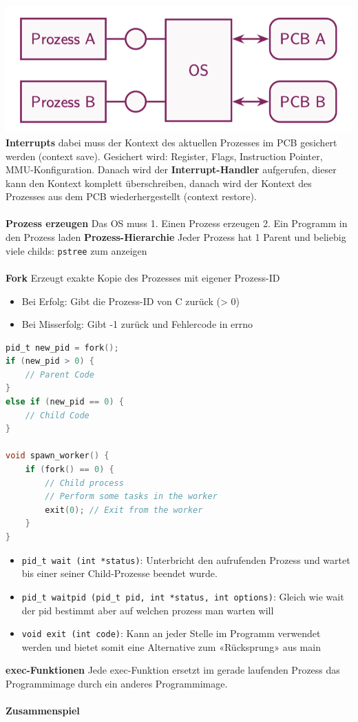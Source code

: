 \documentclass[8pt]{extarticle}
\let\oldtextbf\textbf
\renewcommand{\textbf}{\tiny\oldtextbf}
\begin{document}
\begin{multicols*}{5}
	\includegraphics[scale=0.3]{PCB.png}\\
	\textbf{Interrupts} dabei muss der Kontext des aktuellen Prozesses im PCB gesichert werden (context save). Gesichert wird: Register, Flags, Instruction Pointer, MMU-Konfiguration. Danach wird der \textbf{Interrupt-Handler} aufgerufen, dieser kann den Kontext komplett überschreiben, danach wird der Kontext des Prozesses aus dem PCB wiederhergestellt (context restore).\\\\
	\textbf{Prozess erzeugen} Das OS muss 1. Einen Prozess erzeugen 2. Ein Programm in den Prozess laden
	\textbf{Prozess-Hierarchie} Jeder Prozess hat 1 Parent und beliebig viele childs: \texttt{pstree} zum anzeigen\\\\
	\textbf{Fork} Erzeugt exakte Kopie des Prozesses mit eigener Prozess-ID
	\begin{itemize} [noitemsep, topsep=0pt, leftmargin=*]
		\item Bei Erfolg: Gibt die Prozess-ID von C zurück (> 0)
		\item Bei Misserfolg: Gibt -1 zurück und Fehlercode in errno
	\end{itemize}
	\begin{lstlisting}[language=c]
pid_t new_pid = fork();
if (new_pid > 0) {
	// Parent Code 
}
else if (new_pid == 0) {
	// Child Code
}

void spawn_worker() {
    if (fork() == 0) {
        // Child process
        // Perform some tasks in the worker
        exit(0); // Exit from the worker
    }
}
	\end{lstlisting}
	\begin{itemize} [noitemsep, topsep=0pt, leftmargin=*]
		\item \texttt{pid\_t wait (int *status)}: Unterbricht den aufrufenden Prozess und wartet bis einer seiner Child-Prozesse beendet wurde.
		\item \texttt{pid\_t waitpid (pid\_t pid, int *status, int options)}: Gleich wie wait der pid bestimmt aber auf welchen prozess man warten will
		\item \texttt{void exit (int code)}: Kann an jeder Stelle im Programm verwendet werden und bietet somit eine Alternative zum «Rücksprung» aus main
	\end{itemize}
	\vspace{5pt}
	\textbf{exec-Funktionen} Jede exec-Funktion ersetzt im gerade laufenden Prozess das Programmimage durch ein anderes Programmimage.\\\\
	\textbf{Zusammenspiel}
			

\end{multicols*}
\end{document}

